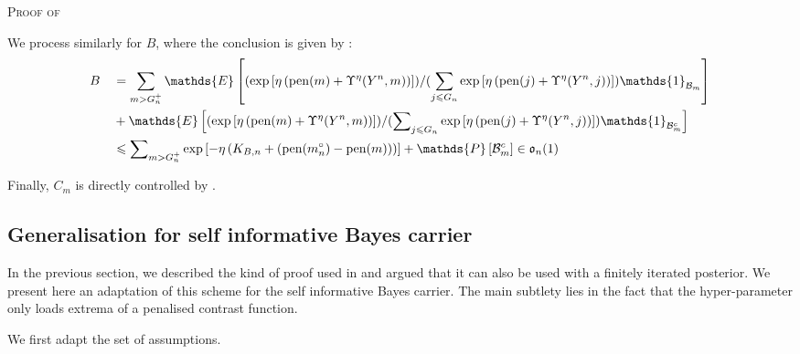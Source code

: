 \begin{pro}{\textsc{Proof of } \\}
\medskip

We process similarly for $B$, where the conclusion is given by :
\begin{alignat*}{2}
& B && = \sum\limits_{m > G^{+}_{n}} \mathds{E}\left[(\exp\left[\eta\left(\pen(m) + \Upsilon^{\eta}(Y^{n}, m)\right)\right])/(\sum\limits_{j \leq G_{n}}\exp\left[\eta \left(\pen(j) + \Upsilon^{\eta}(Y^{n}, j)\right)\right]) \mathds{1}_{\mathcal{B}_{m}}\right] \\
& && + \mathds{E}\left[(\exp\left[\eta\left(\pen(m) + \Upsilon^{\eta}(Y^{n}, m)\right)\right])/(\sum\nolimits_{j \leq G_{n}}\exp\left[\eta \left(\pen(j) + \Upsilon^{\eta}(Y^{n}, j)\right)\right]) \mathds{1}_{\mathcal{B}_{m}^{c}}\right]\\
& && \leq \sum\nolimits_{m > G^{+}_{n}} \exp\left[- \eta\left(K_{B, n} + (\pen(m^{\circ}_{n}) - \pen(m))\right)\right] + \mathds{P}\left[ \mathcal{B}_{m}^{c}\right] \in \mathfrak{o}_{n}(1)
\end{alignat*}

\medskip

Finally, $C_{m}$ is directly controlled by .

\proEnd
\end{pro}

\subsection{Generalisation for self informative Bayes carrier}\label{BAYES_STRATEGIES_EXPOLIM}

In the previous section, we described the kind of proof used in  and argued that it can also be used with a finitely iterated posterior.
We present here an adaptation of this scheme for the self informative Bayes carrier.
The main subtlety lies in the fact that the hyper-parameter only loads extrema of a penalised contrast function.

We first adapt the set of assumptions.

